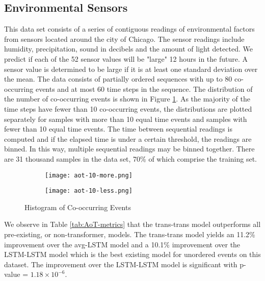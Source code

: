 \documentclass[reqno ,11pt]{article}
\begin{document}
\subsection{Environmental Sensors} This data set consists of a series of contiguous readings of environmental factors from sensors located around the city of Chicago. The sensor readings include humidity, precipitation, sound in decibels and the amount of light detected. We predict if each of the 52 sensor values will be "large" 12 hours in the future. A sensor value is determined to be large if it is at least one standard deviation over the mean. The data consists of partially ordered sequences with up to 80 co-occurring events and at most 60 time steps in the sequence. The distribution of the number of co-occurring events is shown in Figure \ref{fig:aot-coccur}. As the majority of the time steps have fewer than 10 co-occurring events, the distributions are plotted separately for samples with more than 10 equal time events and samples with fewer than 10 equal time events. The time between sequential readings is computed and if the elapsed time is under a certain threshold, the readings are binned. In this way, multiple sequential readings may be binned together. There are 31 thousand samples in the data set, 70\%  of which comprise the training set. 

\begin{figure}[H]
\centering
\begin{subfigure}[t]{0.475\textwidth}
\centering
\texttt{[image: aot-10-more.png]}
\end{subfigure}
\begin{subfigure}[t]{0.475\textwidth}
\centering
\texttt{[image: aot-10-less.png]}
\end{subfigure}
 \caption{Histogram of Co-occurring Events}
\label{fig:aot-coccur}
\end{figure}

We observe in Table \ref{tab:AoT-metrics} that the trans-trans model outperforms all pre-existing, or non-transformer, models. The trans-trans model yields an 11.2\% improvement over the avg-LSTM model and a 10.1\% improvement over the LSTM-LSTM model which is the best existing model for unordered events on this dataset. The improvement over the LSTM-LSTM model is significant with p-value = $1.18\times 10^{-6}$.
\end{document}
